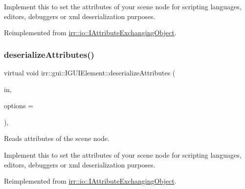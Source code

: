 Implement this to set the attributes of your scene node for scripting languages, editors, debuggers or xml deserialization purposes. 

Reimplemented from \hyperlink{classirr_1_1io_1_1IAttributeExchangingObject_a013d4ead3736d7fab4bc18c2d61a3e2e}{irr\+::io\+::\+I\+Attribute\+Exchanging\+Object}.

\mbox{\label{classirr_1_1gui_1_1IGUIElement_af71b96163b8d95816cd9c80fbf413b4d}} 
\subsubsection{\texorpdfstring{deserialize\+Attributes()}{deserializeAttributes()}\hspace{0.1cm}{\footnotesize\ttfamily [2/2]}}
{\footnotesize\ttfamily virtual void irr\+::gui\+::\+I\+G\+U\+I\+Element\+::deserialize\+Attributes (\begin{DoxyParamCaption}\item[{\hyperlink{classirr_1_1io_1_1IAttributes}{io\+::\+I\+Attributes} $\ast$}]{in,  }\item[{\hyperlink{structirr_1_1io_1_1SAttributeReadWriteOptions}{io\+::\+S\+Attribute\+Read\+Write\+Options} $\ast$}]{options = {} }\end{DoxyParamCaption})\hspace{0.3cm}{\ttfamily [inline]}, {\ttfamily [virtual]}}



Reads attributes of the scene node. 

Implement this to set the attributes of your scene node for scripting languages, editors, debuggers or xml deserialization purposes. 

Reimplemented from \hyperlink{classirr_1_1io_1_1IAttributeExchangingObject_a013d4ead3736d7fab4bc18c2d61a3e2e}{irr\+::io\+::\+I\+Attribute\+Exchanging\+Object}.

\mbox{\label{classirr_1_1gui_1_1IGUIElement_ab79b8e81d2f2864312345cffe9237cce}} 
